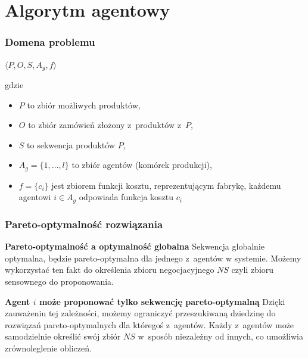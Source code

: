 \documentclass{beamer}
\begin{document}
\section{Algorytm agentowy}
\begin{frame}
    \frametitle{Domena problemu}
    \begin{center}
        $ \big \langle P, O, S, A_{g}, f \big \rangle$
    \end{center}
    gdzie 
    \begin{itemize}
        \item $P$ to zbiór możliwych produktów,
        \item $O$ to zbiór zamówień złożony z~produktów z~$P$,
        \item $S$ to sekwencja produktów $P$,
        \item $A_{g} = \{1, \dots, l\}$ to zbiór agentów (komórek produkcji),
        \item $f = \{c_{i}\}$ jest zbiorem funkcji kosztu, reprezentującym fabrykę, każdemu agentowi $i \in A_{g}$ odpowiada funkcja kosztu $c_{i}$
    \end{itemize}
\end{frame}
\begin{frame}
    \frametitle{Pareto-optymalność rozwiązania}
    \begin{block}{\textbf{Pareto-optymalność a optymalność globalna}} Sekwencja globalnie optymalna, będzie pareto-optymalna dla jednego z~agentów w systemie. Możemy wykorzystać ten fakt do określenia zbioru negocjacyjnego $NS$ czyli zbioru sensownego do proponowania.
    \end{block}

    \begin{block}{
    \textbf{Agent $i$ może proponować tylko sekwencję pareto-optymalną}} Dzięki zauważeniu tej zależności, możemy ograniczyć przeszukiwaną dziedzinę do rozwiązań pareto-optymalnych dla któregoś z~agentów. Każdy z~agentów może samodzielnie określić swój zbiór $NS$ w~sposób niezależny od innych, co umożliwia zrównoleglenie obliczeń.
    \end{block}

\end{frame}
\end{document}
